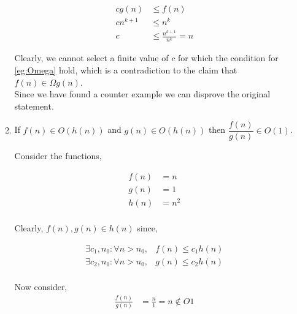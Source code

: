 \begin{enumerate}
\begin{enumerate}
                    \begin{align*}
                        c g \left( n \right) & \le f \left(n \right)         \\
                        c n^{k + 1}          & \le n^k                       \\
                        c                    & \le \frac{n^{k + 1}}{n^k} = n
                    \end{align*}

                    Clearly, we cannot select a finite value of $c$ for which the condition for \ref{eg:Omega} hold, which is
                    a contradiction to the claim that $f \left( n \right) \in \Omega g \left( n \right)$. \\

                    Since we have found a counter example we can disprove the original statement. \\

              \item If $f(n) \in O(h(n))$ and $g(n) \in O(h(n))$ then $\dfrac{f(n)}{g(n)} \in O(1)$.

                    Consider the functions,

                    \begin{align*}
                        f\left(n\right) & = n   \\
                        g\left(n\right) & = 1   \\
                        h\left(n\right) & = n^2 \\
                    \end{align*}

                    Clearly, $f(n), g(n) \in h(n)$ since,

                    \begin{align*}
                        \exists c_1, n_0 : \forall n > n_0, & f\left(n\right) \le c_1 h\left(n\right) \\
                        \exists c_2, n_0 : \forall n > n_0, & g\left(n\right) \le c_2 h\left(n\right) \\
                    \end{align*}

                    Now consider,
                    \begin{align*}
                        \frac{f\left(n\right)}{g\left(n\right)} & = \frac{n}{1} = n \notin O{1}
                    \end{align*}


\end{enumerate}
\end{enumerate}
